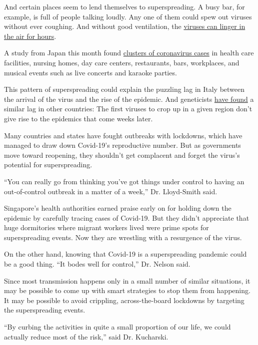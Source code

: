 And certain places seem to lend themselves to superspreading. A busy
bar, for example, is full of people talking loudly. Any one of them
could spew out viruses without ever coughing. And without good
ventilation, the
\href{https://www.nytimes.com/2020/07/04/health/239-experts-with-one-big-claim-the-coronavirus-is-airborne.html}{viruses
can linger in the air for hours}.

A study from Japan this month found
\href{https://wwwnc.cdc.gov/eid/article/26/9/20-2272_article}{clusters
of coronavirus cases} in health care facilities, nursing homes, day care
centers, restaurants, bars, workplaces, and musical events such as live
concerts and karaoke parties.

This pattern of superspreading could explain the puzzling lag in Italy
between the arrival of the virus and the rise of the epidemic. And
geneticists
\href{https://www.nytimes.com/2020/05/27/health/coronavirus-spread-united-states.html}{have
found} a similar lag in other countries: The first viruses to crop up in
a given region don't give rise to the epidemics that come weeks later.

Many countries and states have fought outbreaks with lockdowns, which
have managed to draw down Covid-19's reproductive number. But as
governments move toward reopening, they shouldn't get complacent and
forget the virus's potential for superspreading.

``You can really go from thinking you've got things under control to
having an out-of-control outbreak in a matter of a week,'' Dr.
Lloyd-Smith said.

Singapore's health authorities earned praise early on for holding down
the epidemic by carefully tracing cases of Covid-19. But they didn't
appreciate that huge dormitories where migrant workers lived were prime
spots for superspreading events. Now they are wrestling with a
resurgence of the virus.

On the other hand, knowing that Covid-19 is a superspreading pandemic
could be a good thing. ``It bodes well for control,'' Dr. Nelson said.

Since most transmission happens only in a small number of similar
situations, it may be possible to come up with smart strategies to stop
them from happening. It may be possible to avoid crippling,
across-the-board lockdowns by targeting the superspreading events.

``By curbing the activities in quite a small proportion of our life, we
could actually reduce most of the risk,'' said Dr. Kucharski.

